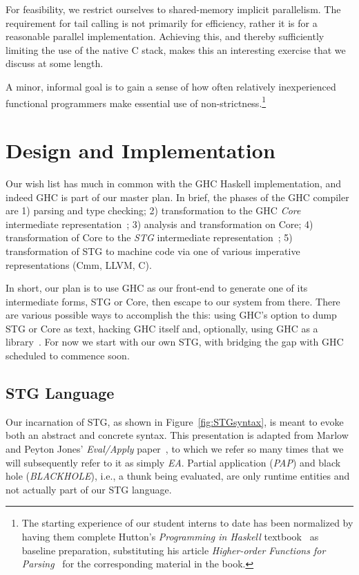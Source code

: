 \documentclass{llncs}
\begin{document}
For feasibility, we restrict ourselves to shared-memory implicit parallelism.
The requirement for tail calling is not primarily for efficiency, rather it
is for a reasonable parallel implementation.  Achieving this, and thereby
sufficiently limiting the use of the native C stack, makes this an interesting
exercise that we discuss at some length.

A minor, informal goal is to gain a sense of how often relatively
inexperienced functional programmers make essential use of
non-strictness.\footnote{The starting experience of our student interns to
  date has been normalized by having them complete Hutton's \emph{Programming
    in Haskell} textbook~\cite{Hutton-book} as baseline preparation,
  substituting his article \emph{Higher-order Functions for
    Parsing}~\cite{Hutton-parsing:1992} for the corresponding material in the
  book.}

\section{Design and Implementation}
Our wish list has much in common with the GHC Haskell implementation, and
indeed GHC is part of our master plan.  In brief, the phases of the GHC
compiler are 1) parsing and type checking; 2) transformation to the GHC
\emph{Core} intermediate representation~\cite{Sulzmann:2007,ghc-core}; 3)
analysis and transformation on Core; 4) transformation of Core to the
\emph{STG} intermediate representation~\cite{PJ-stockhardware}; 5)
transformation of STG to machine code via one of various imperative
representations (Cmm, LLVM, C).

In short, our plan is to use GHC as our front-end to generate one of its
intermediate forms, STG or Core, then escape to our system from there.  There
are various possible ways to accomplish the this: using GHC's option to dump
STG or Core as text, hacking GHC itself and, optionally, using GHC as a
library~\cite{ghc-as-library}.  For now we start with our own STG, with
bridging the gap with GHC scheduled to commence soon.

\subsection{STG Language}

Our incarnation of STG, as shown in Figure~\ref{fig:STGsyntax}, is meant to
evoke both an abstract and concrete syntax.  This presentation is adapted from
Marlow and Peyton Jones' \emph{Eval/Apply} paper~\cite{Marlow:2004}, to which
we refer so many times that we will subsequently refer to it as simply
\emph{EA}. Partial application (\emph{PAP}) and black hole (\emph{BLACKHOLE}),
i.e., a thunk being evaluated, are only runtime entities and not actually part
of our STG language.
\end{document}
